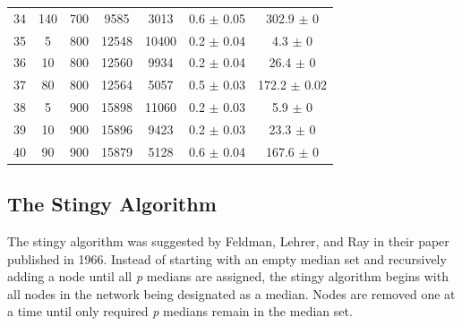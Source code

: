 \documentclass[11pt]{article}
\newcommand{\np}{\newpage}
\begin{document}
\begin{table}[]
{\begin{tabular}{ccccccc}
				\rowcolor[HTML]{EFEFEF} 
				34 & 140 & 700 & 9585 & 3013 & 0.6 $\pm$ 0.05 & 302.9 $\pm$ 0 \\
				35 & 5 & 800 & 12548 & 10400 & 0.2 $\pm$ 0.04 & 4.3 $\pm$ 0 \\
				36 & 10 & 800 & 12560 & 9934 & 0.2 $\pm$ 0.04 & 26.4 $\pm$ 0 \\
				37 & 80 & 800 & 12564 & 5057 & 0.5 $\pm$ 0.03 & 172.2 $\pm$ 0.02 \\
				\rowcolor[HTML]{EFEFEF} 
				38 & 5 & 900 & 15898 & 11060 & 0.2 $\pm$ 0.03 & 5.9 $\pm$ 0 \\
				\rowcolor[HTML]{EFEFEF} 
				39 & 10 & 900 & 15896 & 9423 & 0.2 $\pm$ 0.03 & 23.3 $\pm$ 0 \\
				\rowcolor[HTML]{EFEFEF} 
				40 & 90 & 900 & 15879 & 5128 & 0.6 $\pm$ 0.04 & 167.6 $\pm$ 0
			\end{tabular}%
		}
	\end{table}
	
	\np
	\subsection{The Stingy Algorithm} \label{stingyalgo}
	The stingy algorithm was suggested by Feldman,  Lehrer,  and Ray  in their paper \cite{FELD66} published in 1966.  
	Instead of starting with an empty median set and recursively adding a node until all \textit{p} medians are assigned, the stingy algorithm begins with all nodes in the network being designated as a median.  Nodes are removed one at a time until only required \textit{p} medians remain in the median set.
	
\end{document}
